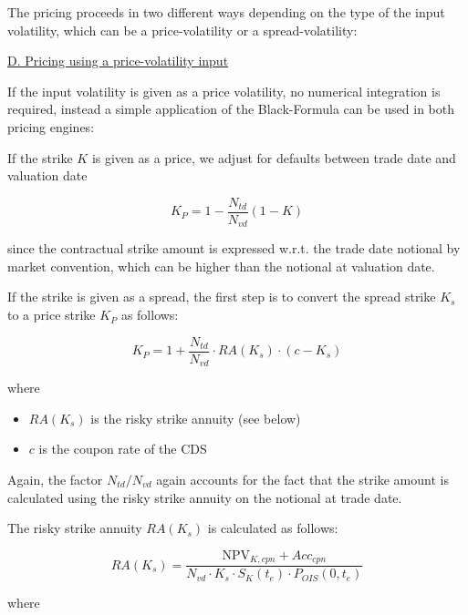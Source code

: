 The pricing proceeds in two different ways depending on the type of the input volatility, which can be a
price-volatility or a spread-volatility:

\underline{D. Pricing using a price-volatility input}

If the input volatility is given as a price volatility, no numerical integration is required, instead a simple
application of the Black-Formula can be used in both pricing engines:

If the strike $K$ is given as a price, we adjust for defaults between trade date and valuation date

\begin{equation}
K_P = 1 - \frac{N_{td}}{N_{vd}} \left( 1 - K \right)
\end{equation}

since the contractual strike amount is expressed w.r.t. the trade date notional by market convention, which can be
higher than the notional at valuation date.

If the strike is given as a spread, the first step is to convert the spread strike $K_s$ to a price strike $K_P$ as
follows:

\begin{equation}
K_P = 1 + \frac{N_{td}}{N_{vd}} \cdot RA(K_s) \cdot (c - K_s)
\end{equation}

where

\begin{itemize}
\item $RA(K_s)$ is the risky strike annuity (see below)
\item $c$ is the coupon rate of the CDS
\end{itemize}

Again, the factor $N_{td} / N_{vd}$ again accounts for the fact that the strike amount is calculated using the risky
strike annuity on the notional at trade date. 

The risky strike annuity $RA(K_s)$ is calculated as follows:

\begin{equation}\label{pricing:cr_indexcdsoption_strike_annuity}
RA(K_s) = \frac{\text{NPV}_{K,cpn} + Acc_{cpn}}{N_{vd} \cdot K_s \cdot S_K(t_e) \cdot P_{OIS}(0,t_e)}
\end{equation}

where

